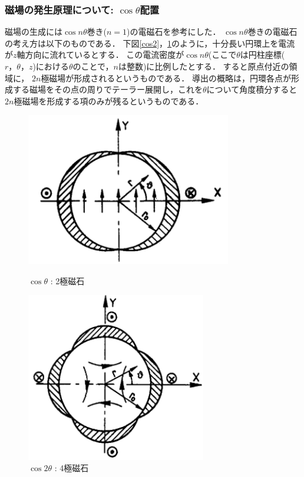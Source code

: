 \subsubsection{磁場の発生原理について: $\cos \theta$配置}
磁場の生成には$\cos n\theta$巻き($n=1$)の電磁石を参考にした．
$\cos n \theta$巻きの電磁石の考え方は以下のものである．
下図\ref{cos2}，\ref{cos4}のように，十分長い円環上を電流が$z$軸方向に流れているとする．
この電流密度が$\cos n\theta$(ここで$\theta$は円柱座標($r，\theta，z$)における$\theta$のことで，$n$は整数)に比例したとする．
すると原点付近の領域に， $2n$極磁場が形成されるというものである．
導出の概略は，円環各点が形成する磁場をその点の周りでテーラー展開し，これを$\theta$について角度積分すると$2n$極磁場を形成する項のみが残るというものである．

\begin{figure}[H]
  \begin{minipage}{0.45\hsize}
    \begin{center}
      \includegraphics[width=0.8\textwidth]{figure/tajima/cos.png}
    \end{center}
    \caption{$\cos\theta$ : 2極磁石}
    \label{cos2}
  \end{minipage}
  \hfill
  \begin{minipage}{0.45\hsize}
    \begin{center}
      \includegraphics[width=0.7\textwidth]{figure/tajima/cos2.png}
    \end{center}
    \caption{$\cos2\theta$ : 4極磁石}
    \label{cos4}
  \end{minipage}
\end{figure}

